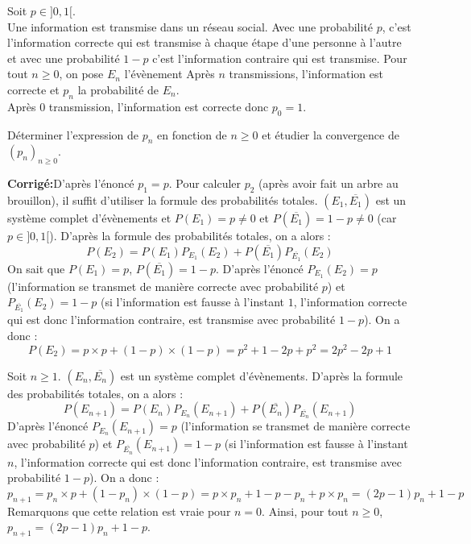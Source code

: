 \documentclass[a4paper,twoside,french,10pt]{VcCours}
\newcommand{\corr}{\textbf{Corrigé:}}
\begin{document}
\begin{Exercice}{} Soit $p \in ]0,1[$. \\
Une information est transmise dans un réseau social. Avec une probabilité $p$, c'est l'information correcte qui est transmise à chaque étape d'une personne à l'autre et avec une probabilité $1-p$ c'est l'information contraire qui est transmise. Pour tout $n \geq 0$, on pose $E_n$ l'évènement \og Après $n$ transmissions, l'information est correcte \fg et $p_n$ la probabilité de $E_n$. \\
\noindent Après 0 transmission, l'information est correcte donc $p_0=1$.

 Déterminer l'expression de $p_n$ en fonction de $n \geq 0$ et étudier la convergence de $(p_n)_{n \geq 0}$.
\end{Exercice}

\corr D'après l'énoncé $p_1=p$. Pour calculer $p_2$ (après avoir fait un arbre au brouillon), il suffit d'utiliser la formule des probabilités totales. $(E_1, \overline{E_1})$ est un système complet d'évènements et $P(E_1)=p \neq 0$ et $P(\overline{E_1})=1-p \neq 0$ (car $p \in ]0,1[$). D'après la formule des probabilités totales, on a alors :
\[ P(E_2)=P(E_1)P_{E_1}(E_2) + P( \overline{E_1}) P_{\overline{E_1}}(E_2) \]
On sait que $P(E_1)=p$, $P(\overline{E_1})=1-p$. D'après l'énoncé $P_{E_1}(E_2)=p$ (l'information se transmet de manière correcte avec probabilité $p$) et $P_{\overline{E_1}}(E_2)=1-p$ (si l'information est fausse à l'instant $1$, l'information correcte qui est donc l'information contraire, est transmise avec probabilité $1-p$). On a donc :
\[ P(E_2)= p\times p + (1-p)\times (1-p) = p^2 + 1 -2p+p^2 = 2p^2-2p+1\]



\noindent Soit $n \geq 1$. $(E_n, \overline{E_n})$ est un système complet d'évènements. D'après la formule des probabilités totales, on a alors :
\[ P(E_{n+1})=P(E_n)P_{E_n}(E_{n+1}) + P( \overline{E_n}) P_{\overline{E_n}}(E_{n+1}) \]
D'après l'énoncé $P_{E_n}(E_{n+1})=p$ (l'information se transmet de manière correcte avec probabilité $p$) et $P_{\overline{E_n}}(E_{n+1})=1-p$ (si l'information est fausse à l'instant $n$, l'information correcte qui est donc l'information contraire, est transmise avec probabilité $1-p$). On a donc :
\[ p_{n+1} = p_n \times p + (1-p_n)\times (1-p) = p \times p_n + 1 -p -p_n+ p \times p_n = (2p-1)p_n + 1-p \]
Remarquons que cette relation est vraie pour $n=0$. Ainsi, pour tout $n \geq 0$, $p_{n+1}=(2p-1)p_n+1-p$.
\end{document}
